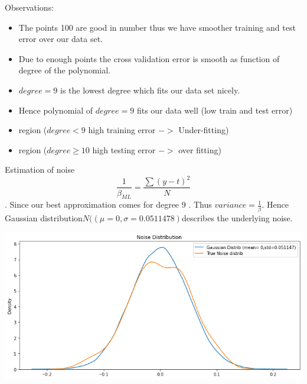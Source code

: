\documentclass[11pt]{beamer}
\begin{document}
\begin{frame}
\begin{Huge}
Observations:
\end{Huge}
\begin{itemize}
\item The points 100 are good in number thus we have smoother training and test error over our data set. 
\item Due to enough points the cross validation error is smooth as function of degree of the polynomial. 
\item $degree=9$ is the lowest degree which fits our data set nicely.
\item Hence polynomial of $degree =9$ fits our data well (low train and test error)

\item region ($degree<9$ high training error $->$ Under-fitting)
\item region ($degree \geq 10 $ high testing error $->$ over fitting)
\end{itemize}
\end{frame}

\begin{frame}

Estimation of noise 
$$\frac{1}{\beta_{ML}}= \frac{\sum{(y-t)^2}}{N}$$.
Since our best approximation comes for degree 9 . Thus $variance =\frac{1}{\beta}$. Hence Gaussian distribution$N((\mu= 0,\sigma=0.0511478) $describes the underlying noise.

\includegraphics[scale=0.35]{images/28.png}
\end{frame}

\end{document}
